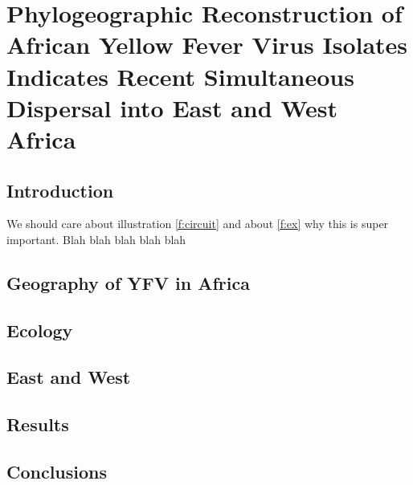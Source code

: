 %

\chapter{Phylogeographic Reconstruction of African Yellow Fever Virus Isolates
	Indicates Recent Simultaneous Dispersal into East and West Africa}
\label{chapter-africa_phylogeography}

\section{Introduction}
\label{introduction}
We should care about illustration \ref{f:circuit} and about \ref{f:ex} why this is super important.
\lipsum[1-2]
Blah blah blah blah blah

\section{Geography of YFV in Africa}
\lipsum[1-2]

\section{Ecology}
\lipsum[1-2]

\section{East and West}
\lipsum[1-2]

\section{Results}
\lipsum[1-2]

\section{Conclusions}
\lipsum[1-2]

\pagebreak 

\label{figures}

\pagebreak
{}
\label{bssvs}

\pagebreak
{}
\label{continuoustree}

\pagebreak
{}
\label{ns5tree}

